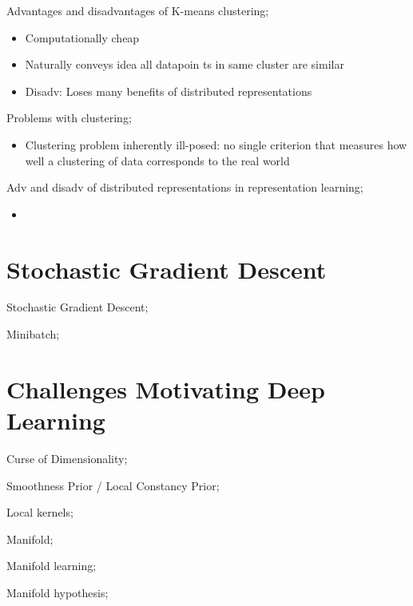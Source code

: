 \documentclass{article}
\begin{document}
Advantages and disadvantages of K-means clustering; \begin{itemize} \item Computationally cheap \item Naturally conveys idea all datapoin ts in same cluster are similar \item Disadv: Loses many benefits of distributed representations \end{itemize}

Problems with clustering; \begin{itemize} \item Clustering problem inherently ill-posed: no single criterion that measures how well a clustering of data corresponds to the real world \end{itemize}

Adv and disadv of distributed representations in representation learning; \begin{itemize}
	\item 
\end{itemize}

\section{Stochastic Gradient Descent}

Stochastic Gradient Descent;

Minibatch;

\section{Challenges Motivating Deep Learning}

Curse of Dimensionality;

Smoothness Prior / Local Constancy Prior;

Local kernels;

Manifold;

Manifold learning;

Manifold hypothesis;
\end{document}
